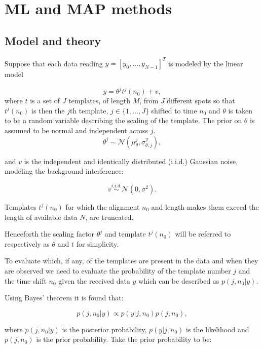 \section{ML and MAP methods}
\subsection{Model and theory}
Suppose that each data reading $y = [y_0, \ldots , y_{N-1}]^T $ is modeled by the linear model

\begin{equation}\label{eq:MLmod1}
y = \theta^j t^j(n_0) + v,
\end{equation}
where $t$ is a set of $J$ templates, of length $M$, from $J$ different spots so that $t^j(n_0)$ is then the $j$th template, $j \in \{1, \ldots ,J\}$ shifted to time $n_0$ and $\theta$ is taken to be a random variable describing the scaling of the template. The prior on $\theta$ is assumed to be normal and independent across $j$.
\begin{equation}\label{eq:MLtheta}
\theta^j \sim \mathcal{N}(\mu^j_{\theta},\sigma_{\theta,j}^2),
\end{equation}

and $v$ is the independent and identically distributed (i.i.d.) Gaussian noise, modeling the background interference:

\begin{equation}\label{eq:MLnoise}
v \stackrel{i.i.d.}{\sim} \mathcal{N}(0,\sigma^2).
\end{equation}

Templates $t^j(n_0)$ for which the alignment $n_0$ and length makes them exceed the length of available data $N$, are truncated.

Henceforth the scaling factor $\theta^j$ and template $t^j(n_0)$ will be referred to respectively as $\theta$ and $t$ for simplicity.

To evaluate which, if any, of the templates are present in the data and when they are observed we need to evaluate the probability of the template number $j$ and the time shift $n_0$ given the received data $y$ which can be described as $p(j,n_0|y)$.

Using Bayes' theorem it is found that:

\begin{equation}\label{eq:MLBayes}
p(j,n_0|y) \propto p(y|j,n_0)p(j,n_0),
\end{equation}

where $p(j,n_0|y)$ is the posterior probability, $p(y|j,n_0)$ is the likelihood and $p(j,n_0)$ is the prior probability.
Take the prior probability to be:

